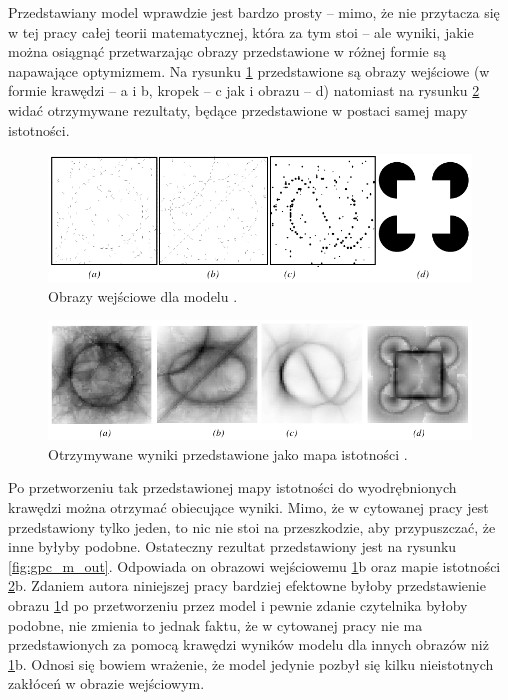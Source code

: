 Przedstawiany model wprawdzie jest bardzo prosty -- mimo, że nie przytacza się w tej pracy całej teorii matematycznej, która za tym stoi -- ale wyniki, jakie można osiągnąć przetwarzając obrazy przedstawione w różnej formie są napawające optymizmem. Na rysunku \ref{fig:gpc_res_in} przedstawione są obrazy wejściowe (w formie krawędzi -- a i b, kropek -- c jak i obrazu -- d) natomiast na rysunku \ref{fig:gpc_res_out} widać otrzymywane rezultaty, będące przedstawione w postaci samej mapy istotności. 

\begin{figure}[ht]
	\centering
	\includegraphics[width=.9\textwidth]{images/gpc_res_1.png}
	\caption{Obrazy wejściowe dla modelu \cite{Guy1993}.}
	\label{fig:gpc_res_in}
\end{figure}

\begin{figure}[ht]
	\centering
	\includegraphics[width=.9\textwidth]{images/gpc_res_2.png}
	\caption{Otrzymywane wyniki przedstawione jako mapa istotności \cite{Guy1993}.}
	\label{fig:gpc_res_out}
\end{figure}

Po przetworzeniu tak przedstawionej mapy istotności do wyodrębnionych krawędzi można otrzymać obiecujące wyniki. Mimo, że w cytowanej pracy jest przedstawiony tylko jeden, to nic nie stoi na przeszkodzie, aby przypuszczać, że inne byłyby podobne. Ostateczny rezultat przedstawiony jest na rysunku \ref{fig:gpc_m_out}. Odpowiada on obrazowi wejściowemu \ref{fig:gpc_res_in}b oraz mapie istotności \ref{fig:gpc_res_out}b. Zdaniem autora niniejszej pracy bardziej efektowne byłoby przedstawienie obrazu \ref{fig:gpc_res_in}d po przetworzeniu przez model i pewnie zdanie czytelnika byłoby podobne, nie zmienia to jednak faktu, że w cytowanej pracy nie ma przedstawionych za pomocą krawędzi wyników modelu dla innych obrazów niż \ref{fig:gpc_res_in}b. Odnosi się bowiem wrażenie, że model jedynie pozbył się kilku nieistotnych zakłóceń w obrazie wejściowym.

